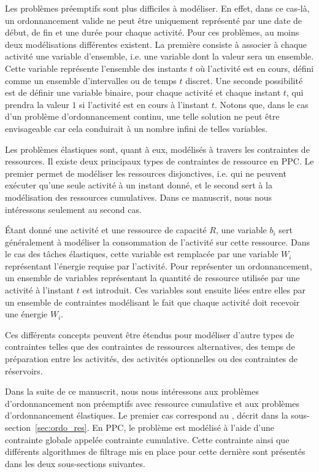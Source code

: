 Les problèmes préemptifs sont plus difficiles à modéliser. En effet,
dans ce cas-là, un ordonnancement valide ne peut être uniquement 
représenté par une date de début, de fin et une durée pour chaque
activité. Pour ces problèmes, au moins deux modélisations différentes
existent. La première consiste à associer à chaque activité une
variable d'ensemble, i.e. une variable dont la valeur sera un
ensemble. Cette variable représente l'ensemble des instants $t$ où
l'activité est en cours, défini comme un ensemble d'intervalles ou de
temps $t$ discret. Une seconde possibilité est de définir une variable
binaire, pour chaque activité et chaque instant $t$, qui prendra la
valeur $1$ si l'activité est en cours à l'instant $t$. Notons que,
dans le cas d'un problème d'ordonnancement continu, une telle solution
ne peut être envisageable car cela conduirait à un nombre infini de
telles variables.

Les problèmes élastiques sont, quant à eux, modélisés à travers les
contraintes de ressources. Il existe deux principaux types de
contraintes de ressource en PPC. Le premier permet de modéliser les
ressources disjonctives, i.e. qui ne peuvent exécuter qu'une seule
activité à un instant donné, et le second sert à la modélisation des
ressources cumulatives. Dans ce manuscrit, nous nous intéressons
seulement au second cas.

{\'E}tant donné une activité et une ressource de capacité $R$, une
variable $b_i$ sert généralement à modéliser la consommation de
l'activité sur cette ressource. Dans le cas des tâches élastiques,
cette variable est remplacée par une variable $W_i$ représentant
l'énergie requise par l'activité. Pour représenter un ordonnancement,
un ensemble de variables représentant la quantité de ressource
utilisée par une activité à l'instant $t$ est introduit. Ces variables
sont ensuite liées entre elles par un ensemble de contraintes
modélisant le fait que chaque activité doit recevoir une énergie
$W_i$. 

Ces différents concepts peuvent être étendus pour modéliser d'autre
types de contraintes telles que des contraintes de ressources
alternatives, des temps de préparation entre les activités, des
activités optionnelles ou des contraintes de réservoirs.

Dans la suite de ce manuscrit, nous nous intéressons aux problèmes
d'ordonnancement non préemptifs avec ressource cumulative et aux
problèmes d'ordonnancement élastiques. Le premier cas correspond au
\CUSP, décrit dans la sous-section~\ref{sec:ordo_res}. En PPC, le
problème est modélisé à l'aide d'une contrainte globale appelée
contrainte cumulative. Cette contrainte ainsi que différents
algorithmes de filtrage mis en place pour cette dernière sont
présentés dans les deux sous-sections suivantes. 

